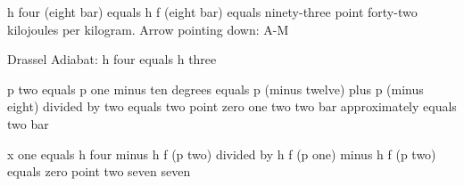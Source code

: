 h four (eight bar) equals h f (eight bar) equals ninety-three point forty-two kilojoules per kilogram.  
Arrow pointing down: A-M  

Drassel Adiabat: h four equals h three  

p two equals p one minus ten degrees equals p (minus twelve) plus p (minus eight) divided by two equals two point zero one two two bar approximately equals two bar  

x one equals h four minus h f (p two) divided by h f (p one) minus h f (p two) equals zero point two seven seven